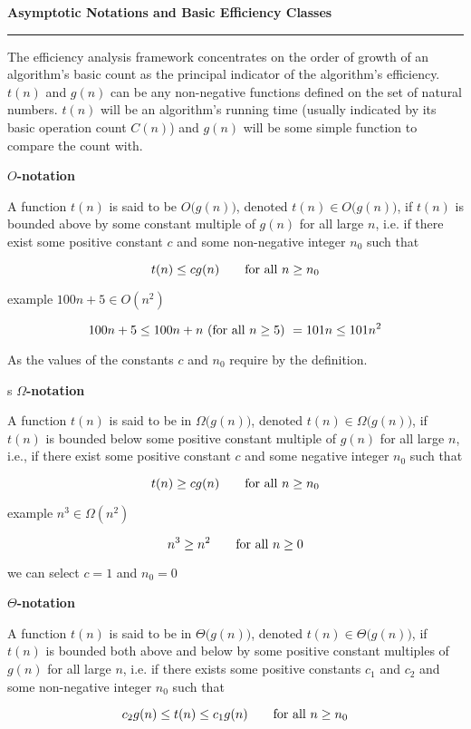 {\bf Asymptotic Notations and Basic Efficiency Classes}
\vskip 1mm
\hrule

\vskip 1cm
The efficiency analysis framework concentrates on the order of growth of an algorithm's basic count as the principal indicator of the algorithm's efficiency. $t(n)$ and $g(n)$ can be any non-negative functions defined on the set of natural numbers. $t(n)$ will be an algorithm's running time (usually indicated by its basic operation count $C(n)$) and $g(n)$ will be some simple function to compare the count with.

\vskip 1cm
{\bf $O$-notation}

\vskip 1mm
A function $t(n)$ is said to be $O\bigl(g(n)\bigr)$, denoted $t(n)\in O\bigl(g(n)\bigr)$, if $t(n)$ is bounded above by some constant multiple of $g(n)$ for all large $n$, i.e. if there exist some positive constant $c$ and some non-negative integer $n_0$ such that

$$t(n)\leq cg(n)\qquad\hbox{for all $n\geq n_0$}$$

example $100n+5\in O(n^2)$

$$100n+5\leq 100n+n\hbox{ (for all $n\geq 5$) }=101n\leq 101n^2$$

As the values of the constants $c$ and $n_0$ require by the definition.

s
\vskip 1cm
{\bf $\Omega$-notation}

\vskip 1mm
A function $t(n)$ is said to be in $\Omega\bigl(g(n)\bigr)$, denoted $t(n)\in\Omega\bigl(g(n)\bigr)$, if $t(n)$ is bounded below some positive constant multiple of $g(n)$ for all large $n$, i.e., if there exist some positive constant $c$ and some negative integer $n_0$ such that

$$t(n)\geq cg(n)\qquad\hbox{for all $n\geq n_0$}$$

example $n^3\in\Omega(n^2)$

$$n^3\geq n^2\qquad\hbox{for all $n\geq 0$}$$

we can select $c=1$ and $n_0=0$

\vskip 1cm
{\bf $\Theta$-notation}

\vskip 1mm
A function $t(n)$ is said to be in $\Theta\bigl(g(n)\bigr)$, denoted $t(n)\in\Theta\bigl(g(n)\bigr)$, if $t(n)$ is bounded both above and below by some positive constant multiples of $g(n)$ for all large $n$,  i.e. if there exists some positive constants $c_1$ and $c_2$ and some non-negative integer $n_0$ such that

$$c_2g(n)\leq t(n)\leq c_1g(n)\qquad\hbox{for all $n\geq n_0$}$$

